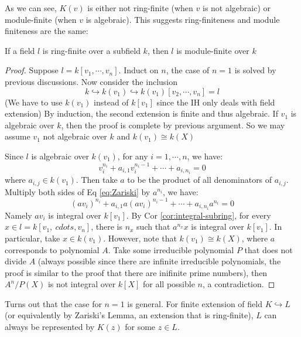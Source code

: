 \documentclass{note-eng}
\begin{document}
As we can see, $K(v)$ is either not ring-finite (when $v$ is not algebraic) or module-finite (when $v$ is algebraic). This suggests ring-finiteness and module finiteness are the same:

\begin{theorem}[Zariski's Lemma, Ring-finite = Module-finite for field extension]
    If a field $l$ is ring-finite over a subfield $k$, then $l$ is module-finite over $k$
\end{theorem}

\begin{proof}
    Suppose $l = k[v_1, \cdots, v_n]$. Induct on $n$, the case of $n = 1$ is solved by previous discussions. Now consider the inclusion
    $$k \hookrightarrow k(v_1) \hookrightarrow k(v_1)[v_2, \cdots, v_n] = l$$
    (We have to use $k(v_1)$ instead of $k[v_1]$ since the IH only deals with field extension) By induction, the second extension is finite and thus algebraic. If $v_1$ is algebraic over $k$, then the proof is complete by previous argument. So we may assume $v_1$ not algebraic over $k$ and $k(v_1) \cong k(X)$
    
    Since $l$ is algebraic over $k(v_1)$, for any $i = 1, \cdots, n$, we have:
    \begin{equation}\label{eq:Zariski}
        v_i^{n_i} + a_{i, 1}v_i^{n_i - 1} + \cdots + a_{i, n_i} = 0
    \end{equation}
    where $a_{i, j} \in k(v_1)$. Then take $a$ to be the product of all denominators of $a_{i, j}$. Multiply both sides of Eq \ref{eq:Zariski} by $a^{n_i}$, we have:
    $$(av_i)^{n_i} + a_{i, 1}a (av_i)^{n_i - 1} + \cdots + a_{i, n_i}a^{n_i} = 0$$
    Namely $av_i$ is integral over $k[v_1]$. By Cor \ref{cor:integral-subring}, for every $x \in l = k[v_1,\ cdots, v_n]$, there is $n_x$ such that $a^{n_x} x$ is integral over $k[v_1]$. In particular, take $x \in k(v_1)$. However, note that $k(v_1) \cong k(X)$, where $a$ corresponds to polynomial $A$. Take some irreducible polynomial $P$ that does not divide $A$ (always possible since there are infinite irreducible polynomials, the proof is similar to the proof that there are inifinite prime numbers), then $A^n / P(X)$ is not integral over $k[X]$ for all possible $n$, a contradiction.
\end{proof}

\iffalse

Turns out that the case for $n = 1$ is general. For finite extension of field $K \hookrightarrow L$ (or equivalently by Zariski's Lemma, an extension that is ring-finite), $L$ can always be represented by $K(z)$ for some $z \in L$.
\end{document}
